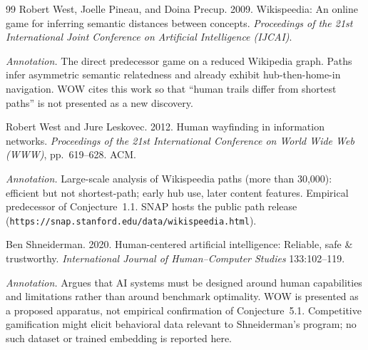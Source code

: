\documentclass[11pt,a4paper]{report}
\begin{document}
\begin{thebibliography}{99}
Robert West, Joelle Pineau, and Doina Precup. 2009. Wikispeedia: An online game for inferring semantic distances between concepts. \textit{Proceedings of the 21st International Joint Conference on Artificial Intelligence (IJCAI)}.

\textit{Annotation.} The direct predecessor game on a reduced Wikipedia graph. Paths infer asymmetric semantic relatedness and already exhibit hub-then-home-in navigation. WOW cites this work so that ``human trails differ from shortest paths'' is not presented as a new discovery.

Robert West and Jure Leskovec. 2012. Human wayfinding in information networks. \textit{Proceedings of the 21st International Conference on World Wide Web (WWW)}, pp.~619--628. ACM.

\textit{Annotation.} Large-scale analysis of Wikispeedia paths (more than 30{,}000): efficient but not shortest-path; early hub use, later content features. Empirical predecessor of Conjecture~1.1. SNAP hosts the public path release (\texttt{https://snap.stanford.edu/data/wikispeedia.html}).

Ben Shneiderman. 2020. Human-centered artificial intelligence: Reliable, safe \& trustworthy. \textit{International Journal of Human–Computer Studies} 133:102--119.

\textit{Annotation.} Argues that AI systems must be designed around human capabilities and limitations rather than around benchmark optimality. WOW is presented as a proposed apparatus, not empirical confirmation of Conjecture~5.1. Competitive gamification might elicit behavioral data relevant to Shneiderman’s program; no such dataset or trained embedding is reported here.

\end{thebibliography}
\end{document}
